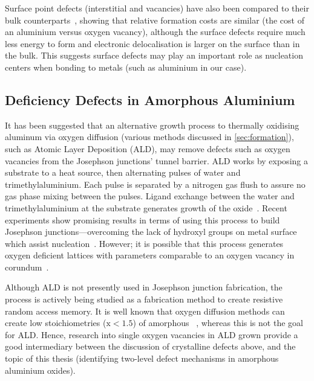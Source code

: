 Surface point defects (interstitial and vacancies) have also been compared to their bulk counterparts~\cite{Carrasco2004}, showing that relative formation costs are similar (\ie the cost of an aluminium versus oxygen vacancy), although the surface defects require much less energy to form and electronic delocalisation is larger on the surface than in the bulk.
This suggests surface defects may play an important role as nucleation centers when bonding to metals (such as aluminium in our case).

\subsection{Deficiency Defects in Amorphous Aluminium}\label{sec:defdef}

It has been suggested that an alternative growth process to thermally oxidising aluminum via oxygen diffusion (\ie various methods discussed in \cref{sec:formation}), such as Atomic Layer Deposition (ALD), may remove defects such as oxygen vacancies from the Josephson junctions' tunnel barrier.
ALD works by exposing a substrate to a heat source, then alternating pulses of water and trimethylaluminium.
Each pulse is separated by a nitrogen gas flush to assure no gas phase mixing between the pulses.
Ligand exchange between the water and trimethylaluminium at the substrate generates growth of the oxide~\cite{George2010}.
Recent experiments show promising results in terms of using this process to build Josephson junctions---overcoming the lack of hydroxyl groups on metal surface which assist nucleation~\cite{Elliot2013}.
However; it is possible that this process generates oxygen deficient lattices with parameters comparable to an oxygen vacancy in corundum~\cite{Perevalov2010}.

Although ALD is not presently used in Josephson junction fabrication, the process is actively being studied as a fabrication method to create resistive random access memory.
It is well known that oxygen diffusion methods can create low stoichiometries (\ie $\text{x}<1.5$) of amorphous ~\cite{Park2002, Tan2005}, whereas this is not the goal for ALD.
Hence, research into single oxygen vacancies in ALD grown  provide a good intermediary between the discussion of crystalline defects above, and the topic of this thesis (identifying two-level defect mechanisms in amorphous aluminium oxides).

